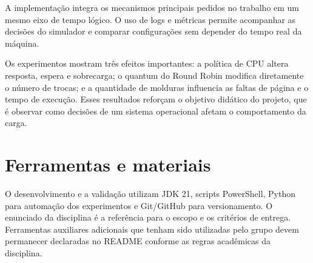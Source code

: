 \documentclass[11pt,a4paper]{article}
\begin{document}
A implementação integra os mecanismos principais pedidos no trabalho em um mesmo eixo de tempo lógico. O uso de logs e métricas permite acompanhar as decisões do simulador e comparar configurações sem depender do tempo real da máquina.

Os experimentos mostram três efeitos importantes: a política de CPU altera resposta, espera e sobrecarga; o quantum do Round Robin modifica diretamente o número de trocas; e a quantidade de molduras influencia as faltas de página e o tempo de execução. Esses resultados reforçam o objetivo didático do projeto, que é observar como decisões de um sistema operacional afetam o comportamento da carga.

\section{Ferramentas e materiais}

O desenvolvimento e a validação utilizam JDK 21, scripts PowerShell, Python para automação dos experimentos e Git/GitHub para versionamento. O enunciado da disciplina é a referência para o escopo e os critérios de entrega. Ferramentas auxiliares adicionais que tenham sido utilizadas pelo grupo devem permanecer declaradas no README conforme as regras acadêmicas da disciplina.
\end{document}
